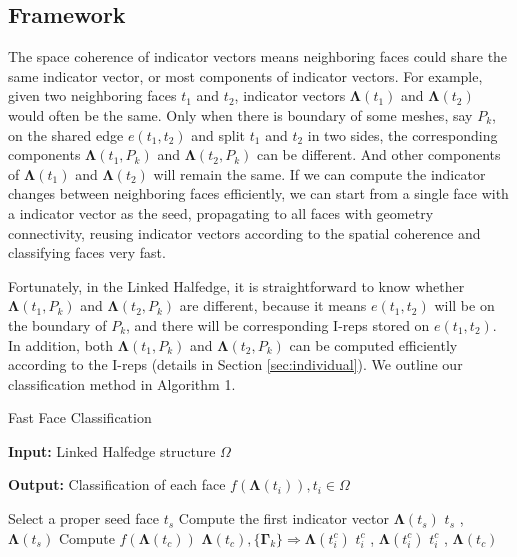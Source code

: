 \documentclass[10pt,journal,compsoc]{IEEEtran}
\begin{document}
\subsection{Framework}

The space coherence of indicator vectors means neighboring faces could share the same indicator vector, or most components of indicator vectors. For example, given two neighboring faces $t_1$ and $t_2$, indicator vectors $\boldsymbol{\Lambda}(t_1)$ and $\boldsymbol{\Lambda}(t_2)$ would often be the same. Only when there is boundary of some meshes, say $P_k$, on the shared edge $e(t_1, t_2)$ and split $t_1$ and $t_2$ in two sides, the corresponding components $\boldsymbol{\Lambda}(t_1, P_k)$ and $\boldsymbol{\Lambda}(t_2, P_k)$ can be different. And other components of $\boldsymbol{\Lambda}(t_1)$ and $\boldsymbol{\Lambda}(t_2)$ will remain the same. If we can compute the indicator changes between neighboring faces efficiently, we can start from a single face with a indicator vector as the seed, propagating to all faces with geometry connectivity, reusing indicator vectors according to the spatial coherence and classifying faces very fast.


Fortunately, in the Linked Halfedge, it is straightforward to know whether $\boldsymbol{\Lambda}(t_1, P_k)$ and $\boldsymbol{\Lambda}(t_2, P_k)$ are different, because it means $e(t_1, t_2)$ will be on the boundary of $P_k$, and there will be corresponding I-reps stored on $e(t_1, t_2)$. In addition, both $\boldsymbol{\Lambda}(t_1, P_k)$ and $\boldsymbol{\Lambda}(t_2, P_k)$ can be computed efficiently according to the I-reps (details in Section \ref{sec:individual}). We outline our classification method in Algorithm 1.

\begin{algorithm}
\caption{Fast Face Classification}
\label{code:floodfill}
\textbf{Input: } Linked Halfedge structure $\Omega$

\textbf{Output: } Classification of each face $f(\boldsymbol{\Lambda}(t_i)), t_i \in \Omega$


\begin{algorithmic}[1]
\State Select a proper seed face $t_s$
\State Compute the first indicator vector $\boldsymbol{\Lambda}(t_s)$
\State {} { $t_s$ , $\boldsymbol{\Lambda}(t_s)$}
\State
{}
    \State Compute $f(\boldsymbol{\Lambda}(t_c))$
            \State $\boldsymbol{\Lambda}(t_c), \{{\boldsymbol{\Gamma}}_k\} \Longrightarrow \boldsymbol{\Lambda}(t_i^c)$
            \State {} { $t_i^c$ , $\boldsymbol{\Lambda}(t_i^c)$}
        \Else
            \State {} { $t_i^c$ , $\boldsymbol{\Lambda}(t_c)$}
        \EndIf
    \EndFor
\EndFunction
\end{algorithmic}
\end{algorithm}
\end{document}
